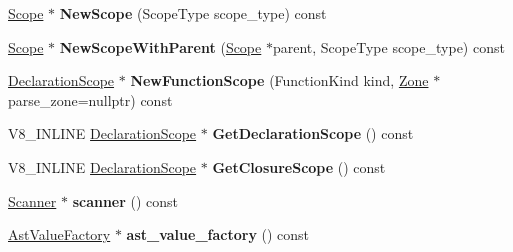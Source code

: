 \begin{DoxyCompactItemize}
\mbox{\label{classv8_1_1internal_1_1ParserBase_ae8f61908e26607f8005ca614bf55d53c}} 
\mbox{\hyperlink{classv8_1_1internal_1_1Scope}{Scope}} $\ast$ {\bfseries New\+Scope} (Scope\+Type scope\+\_\+type) const
\item 
\mbox{\label{classv8_1_1internal_1_1ParserBase_ab2d14c7ec476eb0cb1c71be91803181d}} 
\mbox{\hyperlink{classv8_1_1internal_1_1Scope}{Scope}} $\ast$ {\bfseries New\+Scope\+With\+Parent} (\mbox{\hyperlink{classv8_1_1internal_1_1Scope}{Scope}} $\ast$parent, Scope\+Type scope\+\_\+type) const
\item 
\mbox{\label{classv8_1_1internal_1_1ParserBase_adef1d21a6841c092672d7ae020d37581}} 
\mbox{\hyperlink{classv8_1_1internal_1_1DeclarationScope}{Declaration\+Scope}} $\ast$ {\bfseries New\+Function\+Scope} (Function\+Kind kind, \mbox{\hyperlink{classv8_1_1internal_1_1Zone}{Zone}} $\ast$parse\+\_\+zone=nullptr) const
\item 
\mbox{\label{classv8_1_1internal_1_1ParserBase_a8311b915ef12077c66a88388fed07519}} 
V8\+\_\+\+I\+N\+L\+I\+NE \mbox{\hyperlink{classv8_1_1internal_1_1DeclarationScope}{Declaration\+Scope}} $\ast$ {\bfseries Get\+Declaration\+Scope} () const
\item 
\mbox{\label{classv8_1_1internal_1_1ParserBase_aab9996963dea3cb4b30ecc7e6da91b3d}} 
V8\+\_\+\+I\+N\+L\+I\+NE \mbox{\hyperlink{classv8_1_1internal_1_1DeclarationScope}{Declaration\+Scope}} $\ast$ {\bfseries Get\+Closure\+Scope} () const
\item 
\mbox{\label{classv8_1_1internal_1_1ParserBase_aad680e956748b6cbc8c1fd21ff81324f}} 
\mbox{\hyperlink{classv8_1_1internal_1_1Scanner}{Scanner}} $\ast$ {\bfseries scanner} () const
\item 
\mbox{\label{classv8_1_1internal_1_1ParserBase_a9d7deaaca4bdcee2c6db2a388b311dc4}} 
\mbox{\hyperlink{classv8_1_1internal_1_1AstValueFactory}{Ast\+Value\+Factory}} $\ast$ {\bfseries ast\+\_\+value\+\_\+factory} () const
\item 
\mbox{\label{classv8_1_1internal_1_1ParserBase_a5548d8412e081a3130c3d5a232be5cfa}} 

\end{DoxyCompactItemize}
